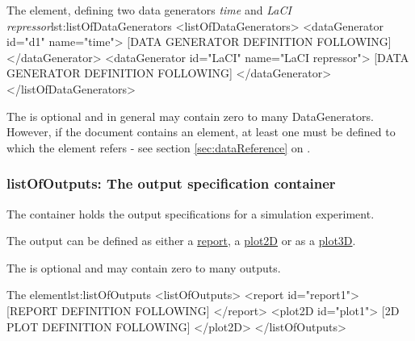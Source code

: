 
%
\begin{myXmlLst}{The  element, defining two data generators \emph{time} and \emph{LaCI repressor}}{lst:listOfDataGenerators}
<listOfDataGenerators>
 <dataGenerator id="d1" name="time">
  [DATA GENERATOR DEFINITION FOLLOWING]
 </dataGenerator>
 <dataGenerator id="LaCI" name="LaCI repressor">
  [DATA GENERATOR DEFINITION FOLLOWING]
 </dataGenerator>
</listOfDataGenerators>
\end{myXmlLst}

The  is optional and in general may contain zero to many DataGenerators. However, if the \currentLV document contains  an    element, at least one   must be defined to which the  element refers -  see section \ref{sec:dataReference} on .


 \subsubsection{listOfOutputs: The output specification container}
\label{sec:listOfOutputs}
The  container holds the output specifications for a simulation experiment. 


The output can be defined as either a \hyperref[class:report]{report}, a \hyperref[class:plot2D]{plot2D} or  as a \hyperref[class:plot3D]{plot3D}. 

The  is optional and may contain zero to many outputs. 

\begin{myXmlLst}{The  element}{lst:listOfOutputs}
<listOfOutputs>
 <report id="report1">
  [REPORT DEFINITION FOLLOWING]
 </report>
 <plot2D id="plot1">
  [2D PLOT DEFINITION FOLLOWING] 
 </plot2D>
</listOfOutputs>
\end{myXmlLst}


